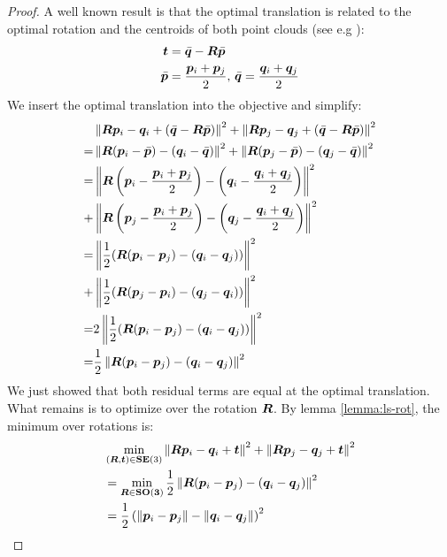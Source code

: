 \begin{proof}
	A well known result is that the optimal translation is related to the optimal rotation and the centroids of both point clouds (see e.g \cite{Kabsch-1976-Point-set-alignment, sorkine2017least}):
	\begin{equation}
		\begin{aligned}
			\vt &= \bar{\vq} - \MR \bar{\vp}\\
			\bar{\vp} &= \frac{\vp_i + \vp_j}{2}, \, \bar{\vq} = \frac{\vq_i + \vq_j}{2}
		\end{aligned}
	\end{equation}
	We insert the optimal translation into the objective and simplify:
	\begin{equation}\label{eq:insert-t-opt}
		\begin{aligned}
			&\normsq{\MR \vp_i - \vq_i  + (\bar{\vq} - \MR \bar{\vp})} +  \normsq{\MR \vp_j - \vq_j  + (\bar{\vq} - \MR \bar{\vp})}\\
			=&\normsq{\MR (\vp_i - \bar{\vp}) - (\vq_i -\bar{\vq})} + \normsq{\MR (\vp_j - \bar{\vp}) - (\vq_j -\bar{\vq})} \\
			=&\normsq{\MR \left(\vp_i - \frac{\vp_i + \vp_j}{2} \right) - \left(\vq_i - \frac{\vq_i + \vq_j}{2} \right)}\\
			+ &\normsq{\MR \left(\vp_j - \frac{\vp_i + \vp_j}{2} \right) - \left(\vq_j -\frac{\vq_i + \vq_j}{2} \right)} \\
			=&\normsq{ \frac{1}{2}(\MR (\vp_i - \vp_j ) - (\vq_i - \vq_j))}\\
			+ &\normsq{ \frac{1}{2}(\MR (\vp_j - \vp_i ) - (\vq_j - \vq_i))}\\
			=& 2\normsq{ \frac{1}{2}(\MR (\vp_i - \vp_j ) - (\vq_i - \vq_j))}\\
			=& \frac{1}{2}\normsq{\MR (\vp_i - \vp_j ) - (\vq_i - \vq_j)}\\
		\end{aligned}
	\end{equation}
	We just showed that both residual terms are equal at the optimal translation.	
	What remains is to optimize over the rotation $\MR$. By lemma \ref{lemma:ls-rot}, the minimum over rotations is:
	\begin{equation}
		\begin{aligned}
			&\min_{(\MR, \vt) \in \SEthree} \normsq{\MR \vp_i - \vq_i  + \vt} +  \normsq{\MR \vp_j - \vq_j  + \vt}\\
			&=\min_{\MR \in \SOthree} \frac{1}{2}\normsq{\MR (\vp_i - \vp_j ) - (\vq_i - \vq_j)}\\
			&= \frac{1}{2} \left( \norm{\vp_i - \vp_j} - \norm{\vq_i - \vq_j} \right)^2
		\end{aligned}
	\end{equation}
\end{proof}

